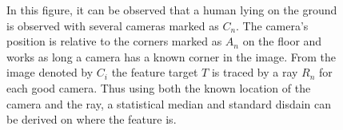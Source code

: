 \def\svgwidth{\columnwidth}
\begin{figure}[ht]
    \centering
           
           \caption[3D human on ground]{
               In this figure, it can be observed that a human lying on the ground is observed with several cameras marked as $C_n$.
               The camera's position is relative to the \aruco corners marked as $A_n$ on the floor and works as long a camera has a known \aruco corner in the image.
               From the image denoted by
               $C_i$
               the feature target $T$ is traced by a ray $R_n$ for each good camera.
               Thus using both the known location of the camera and the ray, a statistical median and standard disdain can be derived on where the feature is.
           }
    \label{fig:3Dhuman}
\end{figure}







